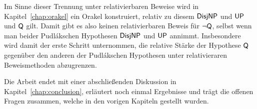Im Sinne dieser Trennung unter relativierbaren Beweise wird in Kapitel~\ref{chap:orakel} ein Orakel konstruiert, relativ zu diesem $\mathsf{DisjNP}$ und $\mathsf{UP}$ und $\mathsf{Q}$ gilt. Damit gibt es also keinen relativierbaren Beweis für $\neg\mathsf{Q}$, selbst wenn man beider Pudlákschen Hypothesen $\mathsf{DisjNP}$ und $\mathsf{UP}$ annimmt. Insbesondere wird damit der erste Schritt unternommen, die relative Stärke der Hypothese $\mathsf{Q}$ gegenüber den anderen der Pudlákschen Hypothesen unter relativieraren Beweismethoden abzugrenzen. 

Die Arbeit endet mit einer abschließenden Diskussion in Kapitel~\ref{chap:conclusion}, erläutert noch einmal Ergebnisse und trägt die offenen Fragen zusammen, welche in den vorigen Kapiteln gestellt wurden.




